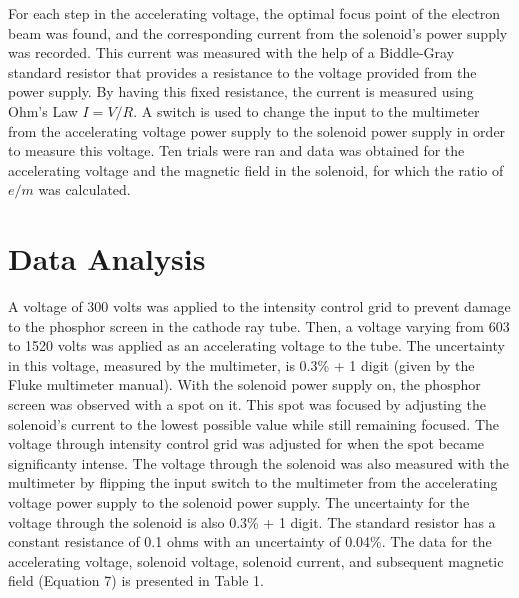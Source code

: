 \documentclass[%
 aip,
 amsmath,amssymb,
 reprint,%
floatfix,
]{revtex4-1}
\begin{document}
For each step in the accelerating voltage, the optimal focus point of the electron beam was found, and the corresponding current from the solenoid's power supply was recorded. This current was measured with the help of a Biddle-Gray standard resistor that provides a resistance to the voltage provided from the power supply. By having this fixed resistance, the current is measured using Ohm's Law $I=V/R$. A switch is used to change the input to the multimeter from the accelerating voltage power supply to the solenoid power supply in order to measure this voltage. Ten trials were ran and data was obtained for the accelerating voltage and the magnetic field in the solenoid, for which the ratio of $e/m$ was calculated.

\section{\label{sec:level4}Data Analysis}

A voltage of 300 volts was applied to the intensity control grid to prevent damage to the phosphor screen in the cathode ray tube. Then, a voltage varying from 603 to 1520 volts was applied as an accelerating voltage to the tube. The uncertainty in this voltage, measured by the multimeter, is 0.3\% + 1 digit (given by the Fluke multimeter manual\cite{Fluke}). With the solenoid power supply on, the phosphor screen was observed with a spot on it. This spot was focused by adjusting the solenoid's current to the lowest possible value while still remaining focused. The voltage through intensity control grid was adjusted for when the spot became significanty intense. The voltage through the solenoid was also measured with the multimeter by flipping the input switch to the multimeter from the accelerating voltage power supply to the solenoid power supply. The uncertainty for the voltage through the solenoid is also 0.3\% + 1 digit. The standard resistor has a constant resistance of 0.1 ohms with an uncertainty of 0.04\%. The data for the accelerating voltage, solenoid voltage, solenoid current, and subsequent magnetic field (Equation 7) is presented in Table 1.
\end{document}
